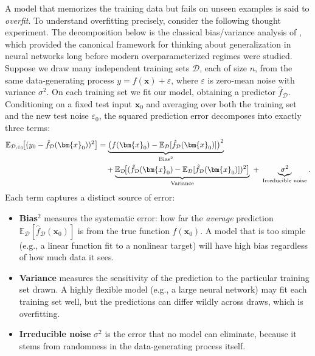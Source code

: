 \documentclass[11pt,a4paper]{report}
\newcommand{\x}{\bm{x}}
\begin{document}
A model that memorizes the training data but fails on unseen examples is said to \emph{overfit}.  To understand overfitting precisely, consider the following thought experiment.  The decomposition below is the classical bias/variance analysis of \citet{geman1992biasvariance}, which provided the canonical framework for thinking about generalization in neural networks long before modern overparameterized regimes were studied.  Suppose we draw many independent training sets $\mathcal{D}$, each of size $n$, from the same data-generating process $y = f(\x) + \varepsilon$, where $\varepsilon$ is zero-mean noise with variance $\sigma^2$.  On each training set we fit our model, obtaining a predictor $\hat{f}_{\mathcal{D}}$.  Conditioning on a fixed test input $\x_0$ and averaging over both the training set and the new test noise $\varepsilon_0$, the squared prediction error decomposes into exactly three terms:
\begin{align}
\mathbb{E}_{\mathcal{D},\varepsilon_0}
\!\bigl[(y_0 - \hat{f}_{\mathcal{D}}(\x_0))^2\bigr]
&=
\underbrace{\bigl(f(\x_0) - \mathbb{E}_{\mathcal{D}}[\hat{f}_{\mathcal{D}}(\x_0)]\bigr)^2}_{\text{Bias}^2}
\notag\\
&\quad+
\underbrace{\mathbb{E}_{\mathcal{D}}\!\bigl[(\hat{f}_{\mathcal{D}}(\x_0) - \mathbb{E}_{\mathcal{D}}[\hat{f}_{\mathcal{D}}(\x_0)])^2\bigr]}_{\text{Variance}}
\;+\;
\underbrace{\sigma^2}_{\text{Irreducible noise}}.
\label{eq:bias-variance}
\end{align}
Each term captures a distinct source of error:
\begin{itemize}[itemsep=2pt]
\item \textbf{Bias$^2$} measures the systematic error: how far the \emph{average} prediction $\mathbb{E}_{\mathcal{D}}[\hat{f}_{\mathcal{D}}(\x_0)]$ is from the true function $f(\x_0)$.  A model that is too simple (e.g., a linear function fit to a nonlinear target) will have high bias regardless of how much data it sees.
\item \textbf{Variance} measures the sensitivity of the prediction to the particular training set drawn.  A highly flexible model (e.g., a large neural network) may fit each training set well, but the predictions can differ wildly across draws, which is overfitting.
\item \textbf{Irreducible noise} $\sigma^2$ is the error that no model can eliminate, because it stems from randomness in the data-generating process itself.
\end{itemize}
\end{document}
